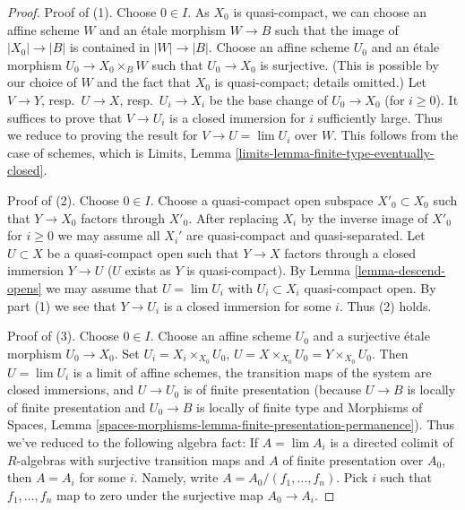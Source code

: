 \documentclass{stacks-project}
\theoremstyle{plain}
\theoremstyle{definition}
\theoremstyle{remark}
\numberwithin{equation}{subsection}
\def\lim{\mathop{\mathrm{lim}}\nolimits}
\begin{document}
\begin{proof}
Proof of (1). Choose $0 \in I$. As $X_0$ is quasi-compact, we can choose
an affine scheme $W$ and an \'etale morphism $W \to B$ such that the image of
$|X_0| \to |B|$ is contained in $|W| \to |B|$. 
Choose an affine scheme $U_0$ and an \'etale morphism
$U_0 \to X_0 \times_B W$ such that $U_0 \to X_0$ is surjective.
(This is possible by our choice of $W$ and the fact that $X_0$ is
quasi-compact; details omitted.)
Let $V \to Y$, resp.\ $U \to X$, resp.\ $U_i \to X_i$ be the base change
of $U_0 \to X_0$ (for $i \geq 0$). It suffices to prove that $V \to U_i$
is a closed immersion for $i$ sufficiently large. Thus we reduce
to proving the result for $V \to U = \lim U_i$ over $W$. This follows from
the case of schemes, which is
Limits, Lemma \ref{limits-lemma-finite-type-eventually-closed}.

\medskip\noindent
Proof of (2). Choose $0 \in I$. Choose a quasi-compact open subspace
$X'_0 \subset X_0$ such that $Y \to X_0$ factors through $X'_0$.
After replacing $X_i$ by the inverse image of $X'_0$ for $i \geq 0$
we may assume all $X_i'$ are quasi-compact and quasi-separated.
Let $U \subset X$ be a quasi-compact open such that $Y \to X$ factors
through a closed immersion $Y \to U$ ($U$ exists as $Y$ is quasi-compact). By
Lemma \ref{lemma-descend-opens}
we may assume that $U = \lim U_i$ with $U_i \subset X_i$ quasi-compact
open. By part (1) we see that $Y \to U_i$ is a closed immersion for some
$i$. Thus (2) holds.

\medskip\noindent
Proof of (3). Choose $0 \in I$. Choose an affine scheme $U_0$
and a surjective \'etale morphism $U_0 \to X_0$.
Set $U_i = X_i \times_{X_0} U_0$,
$U = X \times_{X_0} U_0 = Y \times_{X_0} U_0$. Then $U = \lim U_i$ is a
limit of affine schemes, the transition maps of the system are closed
immersions, and $U \to U_0$ is of finite presentation (because
$U \to B$ is locally of finite presentation and $U_0 \to B$ is locally
of finite type and
Morphisms of Spaces, Lemma
\ref{spaces-morphisms-lemma-finite-presentation-permanence}).
Thus we've reduced to the following algebra fact: If $A = \lim A_i$
is a directed colimit of $R$-algebras with surjective transition
maps and $A$ of finite presentation over $A_0$, then $A = A_i$ for
some $i$. Namely, write $A = A_0/(f_1, \ldots, f_n)$. Pick $i$ such
that $f_1, \ldots, f_n$ map to zero under the surjective map $A_0 \to A_i$.


\end{proof}
\end{document}
